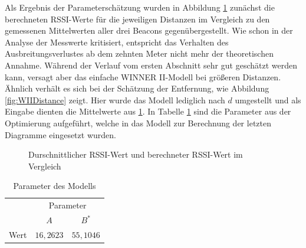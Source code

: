 Als Ergebnis der Parameterschätzung wurden in Abbildung \ref{fig:WIISauelengraph} zunächst die berechneten RSSI-Werte für die jeweiligen Distanzen im Vergleich zu den gemessenen Mittelwerten aller drei Beacons gegenübergestellt. Wie schon in der Analyse der Messwerte kritisiert, entspricht das Verhalten des Ausbreitungsverlustes ab dem zehnten Meter nicht mehr der theoretischen Annahme. Während der Verlauf vom ersten Abschnitt sehr gut geschätzt werden kann, versagt aber das einfache WINNER II-Modell bei größeren Distanzen. Ähnlich verhält es sich bei der Schätzung der Entfernung, wie Abbildung \ref{fig:WIIDistance} zeigt. Hier wurde das Modell lediglich nach $d$ umgestellt und als Eingabe dienten die Mittelwerte aus \ref{fig:WIISauelengraph}. In Tabelle \ref{tab:Parameterwerte} sind die Parameter aus der Optimierung aufgeführt, welche in das Modell zur Berechnung der letzten Diagramme eingesetzt wurden. 
\begin{figure}[H] 
\centering
{}
\caption{Durschnittlicher RSSI-Wert und berechneter RSSI-Wert im Vergleich}
\label{fig:WIISauelengraph}
\end{figure}
\begin{table}[H]
\begin{center}
\begin{tabular}{|c|c|c|}
\cline{2-3}
\multicolumn{1}{c|}{} & \multicolumn{2}{c|}{Parameter} \\
\cline{2-3}
\multicolumn{1}{c|}{} & $A$ & $B^{\ast}$ \\
\hline
\multirow{1}{*}{Wert} & $16,2623$ & $55,1046$ \\
\hline
\end{tabular}
\end{center}
\caption{Parameter des Modells}
\label{tab:Parameterwerte}
\end{table} 
